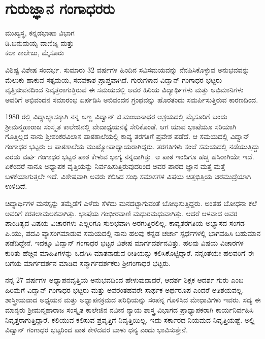{\fontsize{14}{16}\selectfont
\chapter{ಗುರುಜ್ಞಾನ ಗಂಗಾಧರರು}

\begin{center}
\smallskip
 ಮುಖ್ಯಸ್ಥ, ಕನ್ನಡಭಾಷಾ ವಿಭಾಗ\\
ಡಿ.ಬನುಮಯ್ಯ ವಾಣಿಜ್ಯ ಮತ್ತು \\
ಕಲಾ ಕಾಲೇಜು, ಮೈಸೂರು
\addrule
\end{center}

ವಿಶಿಷ್ಟ ವಿಶೇಷ ಸಂದರ್ಭ. ಸುಮಾರು 32 ವರ್ಷಗಳ ಹಿಂದಿನ ಸವಿಸಮಯವನ್ನು ನೆನಪಿಸಿಕೊಳ್ಳುವ ಅನುಭವವನ್ನು ಮೆಲುಕು ಹಾಕುವ ಸತ್ಸಮಯ, ಸದವಕಾಶ ಪ್ರಾಪ್ತವಾಗಿದೆ. ಗುರುಗಳಾದ ವಿದ್ವಾನ್ ಗಂಗಾಧರ ಭಟ್ಟರು ವೃತ್ತಿಜೀವನದಿಂದ ನಿವೃತ್ತರಾಗುತ್ತಿರುವ ಈ ಸಮಯದಲ್ಲಿ ಅವರ ಹಿರಿಯ ವಿದ್ಯಾರ್ಥಿಗಳು ಮತ್ತು ಅಭಿಮಾನಿಗಳು ಅವರಿಗೆ ಅಭಿವಂದನ ಸಮಾರಂಭ ಏರ್ಪಡಿಸಿ ಅಬಿವಂದನ ಗ್ರಂಥವನ್ನು ಹೊರತಂದು ಸಮರ್ಪಿಸುತ್ತಿರುವ ಕಾರಣದಿಂದ.

1980 ರಲ್ಲಿ ವಿದ್ಯಾಭ್ಯಾಸಕ್ಕಾಗಿ ನನ್ನ ಅಣ್ಣ ವಿದ್ವಾನ್ ಜಿ.ಮಂಜುನಾಥರ ಆಶ್ರಯದಲ್ಲಿ ಮೈಸೂರಿಗೆ ಬಂದು ಶ್ರೀಮನ್ಮಹಾರಾಜ ಸಂಸ್ಕೃತ ಕಾಲೇಜಿನಲ್ಲಿ ವೇದಾಧ್ಯಯನಕ್ಕೆ ಸೇರಿಕೊಂಡೆ. ಆಗ ಯಾವ ಭಾಷೆಯೂ ಸರಿಯಾಗಿ ಗೊತ್ತಿಲ್ಲದ ನಾನು ಶ್ರೀಶಂಕರವಿಲಾಸ ಪಾಠಶಾಲೆಯಲ್ಲಿ ಕಾವ್ಯ ತರಗತಿಗೆ ಪ್ರವೇಶ ಪಡೆದೆ. ಆ ಸಮಯದಲ್ಲಿ ವಿದ್ವಾನ್ ಗಂಗಾಧರ ಭಟ್ಟರು ಆ ಪಾಠಶಾಲೆಯ ಮುಖ್ಯೋಪಾಧ್ಯಾಯರಾಗಿದ್ದರು. ತರಗತಿಗಳು ಸಂಜೆ ಸಮಯದಲ್ಲಿ ನಡೆಯುತ್ತಿದ್ದು ಎರಡು ವರ್ಷ ಗಂಗಾಧರ ಭಟ್ಟರ ಪಾಠ ಕೇಳುವ ಭಾಗ್ಯ ನನ್ನದಾಗಿತ್ತು. ಆ ಪಾಠ ಇಂದಿಗೂ ಹಚ್ಚ ಹಸಿರಾಗಿಯೇ ಇದೆ. ಏಕೆಂದರೆ ನಾನೂ ಅಧ್ಯಾಪಕ ವೃತ್ತಿಯನ್ನು ನಿರ್ವಹಿಸುತ್ತಿರುವುದರಿಂದ ಅವರ ಪಾಠದ ಜ್ಞಾನ ಮತ್ತೆ ಮತ್ತೆ ಬಳಕೆಯಾಗುತ್ತಲೇ ಇದೆ. ವಿಶೇಷವಾಗಿ ಅವರು ಕಲಿಸಿದ ಸಂಧಿ  \enginline{-}  ಸಮಾಸಗಳ ವಿಷಯ ಚಿತ್ತಭಿತ್ತಿಯ ಚಿರಮುದ್ರೆಯಾಗಿ ಉಳಿದಿದೆ. 

ಚಿದ್ಯಾರ್ಥಿಗಳ ಮನಸ್ಸನ್ನು ತಮ್ಮೆಡೆಗೆ ಎಳೆದು ಸೆಳೆದು ಮನದಟ್ಟಾಗುವಂತೆ ಬೋಧಿಸುತ್ತಿದ್ದರು. ಅಂತಹ ಬೋಧನಾ ಕಲೆ ಅವರಿಗೆ ಕರತಲಾಮಲಕವಾಗಿತ್ತು. ಭಾಷೆಯ ಗಂಭೀರವಾಣಿ ಮಧುರಮಧುವಾಗಿತ್ತು. ಆದರೆ ಆಳವಾದ ಅವರ ಪಾಂಡಿತ್ಯದ ವಿಷಯ ವಿಚಾರಗಳು ಎಲ್ಲರಿಗೂ ಸುಲಭವಾಗಿ ಅರಗುತ್ತಿರಲಿಲ್ಲ. ಕಾವ್ಯತರಗತಿಯ ಅಭ್ಯಾಸದ ಸಂಗಡ ಪಿ.ಯು, ಪದವಿ ವ್ಯಾಸಂಗಮಾಡುವ ಸಮಯದಲ್ಲಿ ನಾನು ಹಲವು ಕನ್ನಡ ಚರ್ಚಾ ಸ್ಪರ್ಧೆಗಳಲ್ಲಿ ಭಾಗವಹಿಸಿ ಬಹುಮಾನ ಪಡೆದಿದ್ದೇನೆ. ಇದಕ್ಕೂ ವಿದ್ವಾನ್ ಗಂಗಾಧರ ಭಟ್ಟರ ವಿಶೇಷ ಮಾರ್ಗದರ್ಶನವಿತ್ತು. ಹಲವು ವಿಷಯ ವಿಚಾರಗಳ ಕುರಿತು ಹೆಚ್ಚಿನ ಮಾಹಿತಿಗಳನ್ನು ಒದಗಿಸಿ ಮಾತನಾಡುವ ರೀತಿಯನ್ನು ಕಲಿಸಿಕೊಟ್ಟಿದ್ದಾರೆ. ನನ್ನಂತೆಯೇ ಹಲವರಿಗೆ ಈ ಬಗೆಯ ಮಾರ್ಗದರ್ಶನ ಮಾಡಿದ ಸನ್ಮಾರ್ಗದರ್ಶಕರು ಶ್ರೀಗಂಗಾಧರ ಭಟ್ಟರು. 

ನನ್ನ 27 ವರ್ಷಗಳ ಅಧ್ಯಾಪನವೃತ್ತಿಯ ಅನುಭವದಿಂದ ಹೇಳುವುದಾದರೆ, ಆದರ್ಶ ಶಿಕ್ಷಕ ಆದರ್ಶ ಗುರು ಎಂಬ ಹಿರಿಮೆಗೆ ವಿದ್ವಾನ್ ಗಂಗಾಧರ ಭಟ್ಟರು ಮತ್ತು ಅವರಂತಹವರೇ ಸಾರ್ಥಕ ಅರ್ಥರೂಪ ಎಂದರೆ ಅತಿಶಯವಲ್ಲ. ಶಾಸ್ತ್ರೀಯವಾದ ಅಧ್ಯಯನ ಮತ್ತು ಅಧ್ಯಾಪನಕ್ರಮದ ಪರಿಧಿಯನ್ನು ಸಂಪನ್ನ ಗೊಳಿಸಿದ ಮೇಧಾವಿಗಳು ಇವರು. ಸದ್ಯ ಈ ಮಾನ್ಯರು ಶ್ರೀಮನ್ಮಹಾರಾಜ ಸಂಸ್ಕೃತ ಕಾಲೇಜಿನ ನವೀನ ನ್ಯಾಯ ಶಾಸ್ತ್ರ ವಿಭಾಗದ ಪ್ರಾಧ್ಯಾಪಕರಾಗಿ ಕಾರ್ಯನಿರ್ವಹಿಸಿ ನಿವೃತ್ತರಾಗುತ್ತಿದ್ದಾರೆ. ಕಲಿಯುವ ಕಲಿಸುವ ಪ್ರವೃತ್ತಿಗೆ ನಿವೃತ್ತಿಯಿಲ್ಲ. ಇದು ಸರ್ಕಾರದ ನಿಯಮದ ನಿವೃತ್ತಿಯಷ್ಟೆ. ಅಲ್ಲಿ ವಿದ್ವಾನ್ ಗಂಗಾಧರ ಭಟ್ಟರಿಂದ ಪಾಠ ಕೇಳಿದವರ ಬಾಳು ಧನ್ಯ ಎಂದು ಭಾವಿಸುತ್ತೇನೆ.

}
